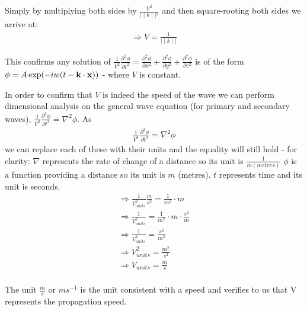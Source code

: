 \documentclass{mm2}
\begin{document}
Simply by multiplying both sides by $\frac{V^2}{\mid \mid k \mid \mid {^2}}$ and then square-rooting both sides we arrive at:
\begin{eqnarray}
\Longrightarrow V = \frac{1}{\mid \mid k \mid \mid}
\end{eqnarray}

This confirms any solution of $ \frac{1}{V^2}\frac{\partial^2 \phi}{\partial t^2}=\frac{\partial^2 \phi}{\partial x^2}+\frac{\partial^2 \phi}{\partial y^2}+
\frac{\partial^2 \phi}{\partial z^2}$ is of the form $\phi = A \exp(-iw(t - {\bf k}\cdot {\bf x} ))$ - where $V$ is constant. 

In order to confirm that $V$ is indeed the speed of the wave we can perform dimensional analysis on the general wave equation (for primary and secondary waves), $\frac{1}{V^2}\frac{\partial^2 \phi}{\partial t^2} = \nabla^2\phi$.
As 
\begin{eqnarray}
\frac{1}{V^2} \frac{\partial^2 \phi}{\partial t^2} = \nabla^2 \phi
\end{eqnarray}
we can replace each of these with their units and the equality will still hold - for clarity:
$\nabla$ represents the rate of change of a distance so its unit is $\frac{1}{m (metres)}$
$\phi$ is a function providing a distance so its unit is $m$ (metres).
$t$ represents time and its unit is seconds.
\begin{eqnarray}
\Rightarrow \frac{1}{V_{units}^2} \frac{m}{s^2} = \frac{1}{m^2} \cdot m\\
\Rightarrow \frac{1}{V_{units}^2}  = \frac{1}{m^2} \cdot m \cdot \frac{s^2}{m}\\
\Rightarrow \frac{1}{V_{units}^2}  = \frac{s^2}{m^2}\\
\Rightarrow V_{units}^2  = \frac{m^2}{s^2}\\
\Rightarrow V_{units} = \frac{m}{s}\\
\end{eqnarray}

The unit $\frac{m}{s}$ or $ms^{-1}$ is the unit consistent with a speed and verifies to us that V represents the propagation speed.
\end{document}
